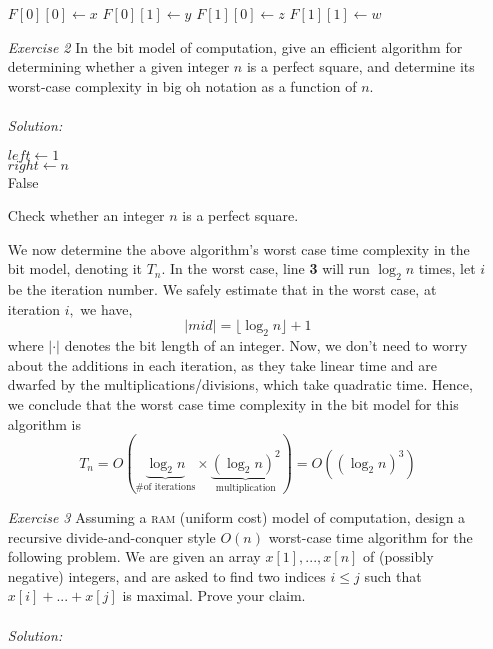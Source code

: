 \documentclass[12pt]{article}
\theoremstyle{definition}
\theoremstyle{remark}
\newcommand\sol{%
  \\ 
  \\
  \textit{Solution:}\\%
}
\begin{document}
\begin{enumerate}
\begin{algorithm}
{    $F[0][0] \leftarrow x$\;
    $F[0][1] \leftarrow y$\;
    $F[1][0] \leftarrow z$\;
    $F[1][1] \leftarrow w$\;
}
\BlankLine

\end{algorithm}

\newpage
\item[\it Exercise 2] In the bit model of computation, give an efficient algorithm for determining whether a given integer $n$ is a perfect square, and determine its worst-case complexity in big oh notation as a function of $n$.
\sol  
\IncMargin{1em}
\begin{algorithm}

\BlankLine
$left \leftarrow 1$ \\ 
$right \leftarrow n$ \\ 
  \Return False

\caption{Check whether an integer $n$ is a perfect square. }\label{algo_disjdecomp}
\end{algorithm}\DecMargin{1em}


We now determine the above algorithm's worst case time complexity in the bit model, denoting it $T_n$. In the worst case, line \textbf{3} will run $\log_2 n$ times, let $i$ be the iteration number. We safely estimate that in the worst case, at iteration $i,$ we have, $$|mid|= \lfloor \log_2 n \rfloor + 1$$ 
where $|\cdot |$ denotes the bit length of an integer. Now, we don't need to worry about the additions in each iteration, as they take linear time and are dwarfed by the multiplications/divisions, which take quadratic time. Hence, we conclude that the worst case time complexity in the bit model for this algorithm is 
$$T_n = O(\underbrace{\log_2 n}_{\text{\# of iterations}} \times \underbrace{(\log_2 n)^2}_{\text{multiplication}}) = O((\log_2 n )^3) $$
\newpage 
\item[\it Exercise 3] Assuming a \textsc{ram} (uniform cost) model of computation, design a recursive divide-and-conquer style $O(n)$ worst-case time algorithm for the following problem. We are given an array $x[1],... , x[n]$ of (possibly negative) integers, and are asked to find two indices $i \leq j$ such that $ x[i] +...+ x[j]$ is maximal. Prove your claim.
\sol 


\end{enumerate}
\end{document}
